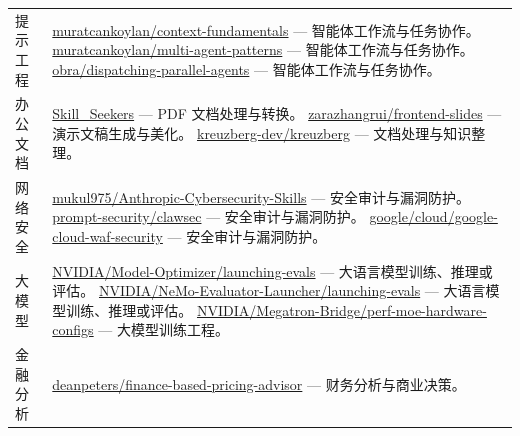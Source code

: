 \documentclass[UTF8,a4paper,12pt]{ctexart}
\begin{document}
\begin{longtable}{p{2.6cm} p{12cm}}
\addlinespace
提示工程 & \href{https://github.com/muratcankoylan/Agent-Skills-for-Context-Engineering/tree/main/skills/context-fundamentals}{muratcankoylan/context-fundamentals} — 智能体工作流与任务协作。
  \newline \href{https://github.com/muratcankoylan/Agent-Skills-for-Context-Engineering/tree/main/skills/multi-agent-patterns}{muratcankoylan/multi-agent-patterns} — 智能体工作流与任务协作。
  \newline \href{https://github.com/obra/superpowers/blob/main/skills/dispatching-parallel-agents/SKILL.md}{obra/dispatching-parallel-agents} — 智能体工作流与任务协作。\\
\addlinespace
办公文档 & \href{https://github.com/yusufkaraaslan/Skill_Seekers}{Skill\_Seekers} — PDF 文档处理与转换。
  \newline \href{https://github.com/zarazhangrui/frontend-slides}{zarazhangrui/frontend-slides} — 演示文稿生成与美化。
  \newline \href{https://github.com/kreuzberg-dev/kreuzberg/tree/main/skills/kreuzberg}{kreuzberg-dev/kreuzberg} — 文档处理与知识整理。\\
\addlinespace
网络安全 & \href{https://github.com/mukul975/Anthropic-Cybersecurity-Skills}{mukul975/Anthropic-Cybersecurity-Skills} — 安全审计与漏洞防护。
  \newline \href{https://github.com/prompt-security/clawsec}{prompt-security/clawsec} — 安全审计与漏洞防护。
  \newline \href{https://github.com/google/skills/tree/main/skills/cloud/google-cloud-waf-security}{google/cloud/google-cloud-waf-security} — 安全审计与漏洞防护。\\
\addlinespace
大模型 & \href{https://github.com/NVIDIA/skills/tree/main/skills/Model-Optimizer/launching-evals}{NVIDIA/Model-Optimizer/launching-evals} — 大语言模型训练、推理或评估。
  \newline \href{https://github.com/NVIDIA/skills/tree/main/skills/NeMo-Evaluator-Launcher/launching-evals}{NVIDIA/NeMo-Evaluator-Launcher/launching-evals} — 大语言模型训练、推理或评估。
  \newline \href{https://github.com/NVIDIA/skills/tree/main/skills/Megatron-Bridge/perf-moe-hardware-configs}{NVIDIA/Megatron-Bridge/perf-moe-hardware-configs} — 大模型训练工程。\\
\addlinespace
金融分析 & \href{https://github.com/deanpeters/Product-Manager-Skills/tree/main/skills/finance-based-pricing-advisor}{deanpeters/finance-based-pricing-advisor} — 财务分析与商业决策。

\end{longtable}
\end{document}
